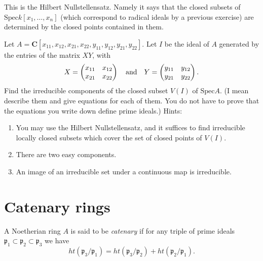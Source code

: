 \begin{remark}
This is the Hilbert Nullstellensatz. Namely it says
that the closed subsets of $\text{Spec} k[x_1,\ldots,x_n]$ (which correspond
to radical ideals by a previous exercise) are determined by the 
closed points contained in them.
\end{remark}

\begin{exercise}
Let $A =
{\mathbf C}[x_{11}, x_{12}, x_{21}, x_{22}, y_{11}, y_{12}, y_{21}, y_{22}]$.
Let $I$ be the ideal of $A$ generated by the entries of the
matrix $XY$, with 
$$
X = \left(
\begin{matrix}
x_{11} & x_{12}\\
x_{21} & x_{22}
\end{matrix}
\right)
\quad \hbox{and} \quad
Y = \left(
\begin{matrix}
y_{11} & y_{12}\\
y_{21} & y_{22}
\end{matrix}
\right).
$$
Find the irreducible components of the closed subset $V(I)$ of $\text{Spec} A$.
(I mean describe them and give equations for each of them. You do not have
to prove that the equations you write down define prime ideals.) Hints:
\begin{enumerate}
\item You may use the Hilbert Nullstellensatz, and it suffices to find
irreducible locally closed subsets which cover the set of closed points of $V(I)$.
\item There are two easy components. 
\item An image of an irreducible set under a continuous map is 
irreducible.
\end{enumerate}
\end{exercise}







\section{Catenary rings}
\label{section-catenary}

\begin{definition}
A Noetherian ring $A$ is said to be {\it catenary}
if for any triple of prime ideals
${\mathfrak p}_1 \subset {\mathfrak p}_2 \subset {\mathfrak p}_3$
we have
$$
ht({\mathfrak p}_3 / {\mathfrak p}_1) = ht({\mathfrak p}_3/{\mathfrak p}_2) + ht({\mathfrak p}_2/{\mathfrak p}_1).
$$
\end{definition}

